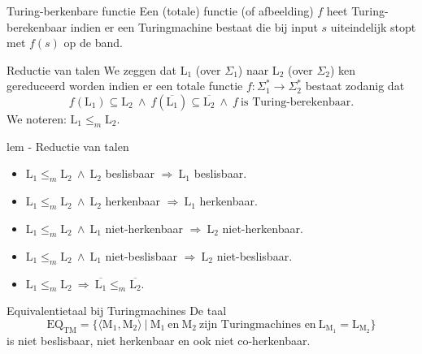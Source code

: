 \vspace{0.5cm}

\begin{theo}{Turing-berkenbare functie}
    Een (totale) functie (of afbeelding) $f$ heet Turing-berekenbaar indien er een Turingmachine bestaat die bij input $s$ uiteindelijk stopt met $f(s)$ op de band.
\end{theo}

\begin{theo}{Reductie van talen}
    We zeggen dat L$_1$ (over $\Sigma_1$) naar L$_2$ (over $\Sigma_2$) ken gereduceerd worden indien er een totale functie $f: \Sigma_1^* \to \Sigma_2^*$ bestaat zodanig dat
    \begin{equation*}
        f(\text{L}_1) \subseteq \text{L}_2 \ \land \ f(\overline{\text{L}_1}) \subseteq \overline{\text{L}_2} \ \land \ f \ \text{is Turing-berekenbaar}.
    \end{equation*}
    We noteren: $\text{L}_1 \leq_m \text{L}_2$.
\end{theo}

\newpage

\begin{lem}{lem - Reductie van talen}
    \begin{itemize}
        \item 
            $\text{L}_1 \leq_m \text{L}_2 \ \land \ \text{L}_2$ beslisbaar $\Rightarrow \ \text{L}_1$ beslisbaar.
        \item 
            $\text{L}_1 \leq_m \text{L}_2 \ \land \ \text{L}_2$ herkenbaar $\Rightarrow \ \text{L}_1$ herkenbaar.
        \item 
            $\text{L}_1 \leq_m \text{L}_2 \ \land \ \text{L}_1$ niet-herkenbaar $\Rightarrow \ \text{L}_2$ niet-herkenbaar.
        \item 
            $\text{L}_1 \leq_m \text{L}_2 \ \land \ \text{L}_1$ niet-beslisbaar $\Rightarrow \ \text{L}_2$ niet-beslisbaar.
        \item 
            $\text{L}_1 \leq_m \text{L}_2 \ \Rightarrow \ \overline{\text{L}_1} \leq_m \overline{\text{L}_2}$.
    \end{itemize}
\end{lem}

\begin{lem}{Equivalentietaal bij Turingmachines}
    De taal
    \begin{equation*}
        \text{EQ}_{\text{TM}} = \{\langle \text{M}_1, \text{M}_2 \rangle \ | \ \text{M}_1 \ \text{en} \ \text{M}_2 \ \text{zijn Turingmachines en} \ \text{L}_{\text{M}_1} = \text{L}_{\text{M}_2} \}
    \end{equation*}
    is niet beslisbaar, niet herkenbaar en ook niet co-herkenbaar.
\end{lem}

